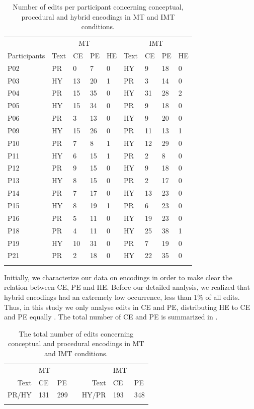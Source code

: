 \documentclass[output=paper]{langsci/langscibook}
\begin{document}
\begin{table}
\begin{tabular}{lllllllll}
\lsptoprule 
& \multicolumn{4}{c}{MT} & \multicolumn{4}{c}{IMT} \\
Participants & Text & CE & PE & HE & Text & CE & PE & HE \\
\midrule
P02 & PR & 0 & 7 & 0  & HY & 9 & 18 & 0\\
P03 & HY & 13 & 20 & 1  & PR & 3 & 14 & 0\\
P04 & PR & 15 & 35 & 0  & HY & 31 & 28 & 2\\
P05 & HY & 15 & 34 & 0  & PR & 9 & 18 & 0\\
P06 & PR & 3 & 13 & 0  & HY & 9 & 20 & 0\\
P09 & HY & 15 & 26 & 0  & PR & 11 & 13 & 1\\
P10 & PR & 7 & 8 & 1  & HY & 12 & 29 & 0\\
P11 & HY & 6 & 15 & 1  & PR & 2 & 8 & 0\\
P12 & PR & 9 & 15 & 0  & HY & 9 & 18 & 0\\
P13 & HY & 8 & 15 & 0  & PR & 2 & 17 & 0\\
P14 & PR & 7 & 17 & 0  & HY & 13 & 23 & 0\\
P15 & HY & 8 & 19 & 1  & PR & 6 & 23 & 0\\
P16 & PR & 5 & 11 & 0  & HY & 19 & 23 & 0\\
P18 & PR & 4 & 11 & 0  & HY & 25 & 38 & 1\\
P19 & HY & 10 & 31 & 0  & PR & 7 & 19 & 0\\
P21 & PR & 2 & 18 & 0  & HY & 22 & 35 & 0\\
\lspbottomrule
\end{tabular}
\caption{Number of edits per participant concerning conceptual, procedural and hybrid encodings in MT and IMT conditions.}
\label{sarto:tab:1}
\end{table}



Initially, we characterize our data on encodings in order to make clear the relation between CE, PE and HE.  Before our detailed analysis, we realized that hybrid encodings had an extremely low occurrence, less than 1\% of all edits. Thus, in this study we only analyse edits in CE and PE, distributing HE to CE and PE equally \citep[cf.][]{alves2013}. The total number of CE and PE is summarized in .

\begin{table}[b]
\begin{tabular}{rllcrll}
\lsptoprule
{~} & {MT} & ~ && {~} & {IMT} & ~\\
Text & CE & PE && Text & CE & PE\\
\midrule
PR/HY & 131 & 299 && HY/PR & 193 & 348\\
\lspbottomrule
\end{tabular}
\caption{The total number of edits concerning conceptual and procedural encodings in MT and IMT conditions.}
\label{sarto:tab:2}
\end{table}
\end{document}

